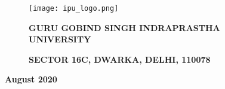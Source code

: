 \documentclass{article}
\begin{document}
\bigskip

\begin{figure}[htbp] 
	\begin{center}
		\texttt{[image: ipu\_logo.png]}
		\label{fig:banana}
	\end{center}
\begin{center}
{\fontsize{12}{13}\selectfont \textbf{GURU GOBIND SINGH INDRAPRASTHA UNIVERSITY} }
\end{center}
\begin{center}
{\fontsize{12}{13}\selectfont \textbf{SECTOR 16C, DWARKA, DELHI, 110078} }
\end{center}
\end{figure}



\begin{center}
{\fontsize{12}{13}\selectfont \textbf{August 2020} }
\end{center}
\end{document}
